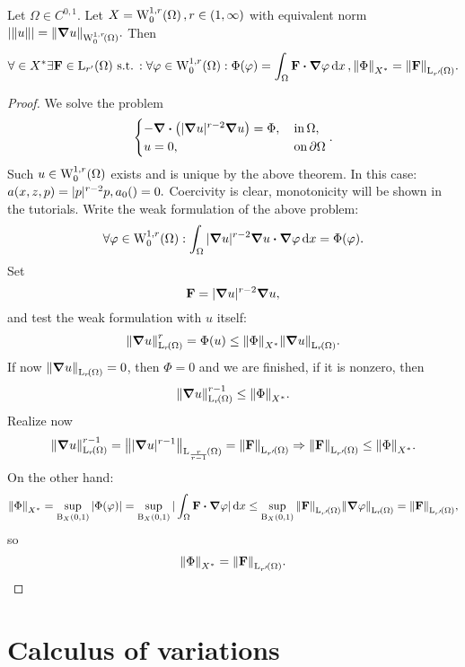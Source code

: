 \documentclass{article}
\begin{document}
\begin{theorem}
	Let $\Omega \in C^{0,1}.$ Let $X = \WkpzeroSet[1][r]{\Omega}, r \in \qty(1,\infty)$ with equivalent norm $|\norm{u}| = \norm{\grad u}_{\WkpzeroSet[1][r]{\Omega}}.$ Then
	\[
		\forall \in X^{*} \exists \vb{F} \in \LpSet[r']{\Omega} \, \text{s.t.} \,: \forall \varphi \in \WkpzeroSet[1][r]{\Omega}: \Phi(\varphi) = \int_{\Omega}\vb{F} \vdot \grad \varphi\dd{x}, \norm{\Phi}_{X^{*}} = \norm{\vb{F}}_{\LpSet[r']{\Omega}}.
	\]
\end{theorem}
\begin{proof}
    We solve the problem
    \[
	    \begin{cases}
		    - \divergence{\qty(|\grad u|^{r-2}\grad u)} = \Phi, & \, \text{in} \, \Omega, \\
		    u = 0, & \, \text{on} \, \partial \Omega
	    \end{cases}.
    \]
    Such $u \in \WkpzeroSet[1][r]{\Omega}$ exists and is unique by the above theorem. In this case: $a\qty(x,z,p) = |p|^{r-2} p, a_0() = 0.$ Coercivity is clear, monotonicity will be shown in the tutorials. Write the weak formulation of the above problem:
    \[
	    \forall \varphi \in \WkpzeroSet[1][r]{\Omega}: \int_{\Omega}|\grad u|^{r-2} \grad u \vdot \grad \varphi \dd{x} = \Phi\qty(\varphi).
    \]
    Set
    \[
	    \vb{F} = |\grad u|^{r-2} \grad u,
    \]
    and test the weak formulation with $u$ itself:
    \[
	    \norm{\grad u}_{\LpSet[r]{\Omega}}^r = \Phi(u) \leq \norm{\Phi}_{X^{*}} \norm{\grad u}_{\LpSet[r]{\Omega}}.
    \]
    If now $\norm{\grad u}_{\LpSet[r]{\Omega}} = 0$, then $\Phi = 0$ and we are finished, if it is nonzero, then
    \[
	    \norm{\grad u}_{\LpSet[r]{\Omega}}^{r-1} \leq \norm{\Phi}_{X^{*}}.
    \]
    Realize now
    \[
	    \norm{\grad u}_{\LpSet[r]{\Omega}}^{r-1} = \norm{| \grad u|^{r-1}}_{\LpSet[\frac{r}{r-1}]{\Omega}} = \norm{\vb{F}}_{\LpSet[r']{\Omega}} \Rightarrow \norm{\vb{F}}_{\LpSet[r']{\Omega}} \leq \norm{\Phi}_{X^{*}}.
    \]
    On the other hand:
    \[
	    \norm{\Phi}_{X^{*}} = \sup_{\text{B}_{X}(0,1)} |\Phi(\varphi)| = \sup_{\text{B}_{X}(0,1)} |\int_{\Omega}\vb{F} \vdot \grad \varphi|\dd{x} \leq \sup_{\text{B}_{X}(0,1)} \norm{\vb{F}}_{\LpSet[r']{\Omega}} \norm{\grad \varphi}_{\LpSet[r]{\Omega}} = \norm{\vb{F}}_{\LpSet[r']{\Omega}},
    \]
    so
    \[
	    \norm{\Phi}_{X^{*}} = \norm{\vb{F}}_{\LpSet[r']{\Omega}}.
    \]

\end{proof}


\section{Calculus of variations}
\label{sec:calculus_of_variations}
\end{document}
